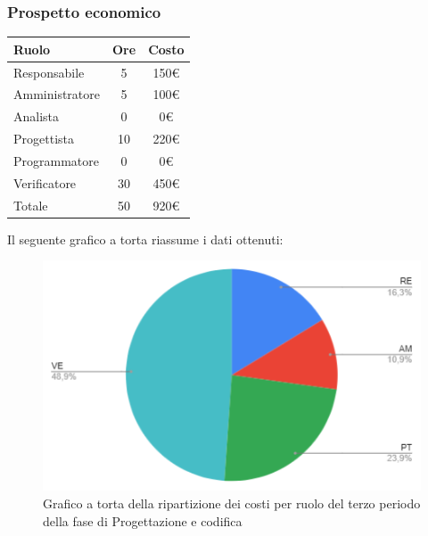 {{{{{{{{{{{{{{		\subsubsection{Prospetto economico}\label{PreventivoFaseDiProgettazioneDiDettaglioECodificaProspettoEconomicoPeriodo3}
		\quad
		\def\tabularxcolumn#1{m{#1}}
		{
			\begin{center}
				\renewcommand{\arraystretch}{1.4}
				\begin{tabularx}{7cm}{|X|c|c|}
					\hline
					\rowcolor{airforceblue}
					\textbf{Ruolo} & \textbf{Ore} & \textbf{Costo}\\
					\hline
					Responsabile & 5 & 150\euro\\
					\hline
					Amministratore & 5 & 100\euro\\
					\hline
					Analista & 0 & 0\euro\\
					\hline
					Progettista & 10 & 220\euro\\
					\hline
					Programmatore & 0 & 0\euro\\
					\hline
					Verificatore & 30 & 450\euro\\
					\hline
					Totale & 50 & 920\euro\\
					\hline
				\end{tabularx}
			\end{center}

			Il seguente grafico a torta riassume i dati ottenuti:
			\begin{figure}[!ht]
				\begin{center}
					\includegraphics[width=0.8\linewidth]{../immagini/pdp/torta_progettazione_dettaglio_periodo3.png}
					\caption{Grafico a torta della ripartizione dei costi per ruolo del terzo periodo della fase di Progettazione e codifica}
				\end{center}
			\end{figure}

}}}}}}}}}}}}}}}
